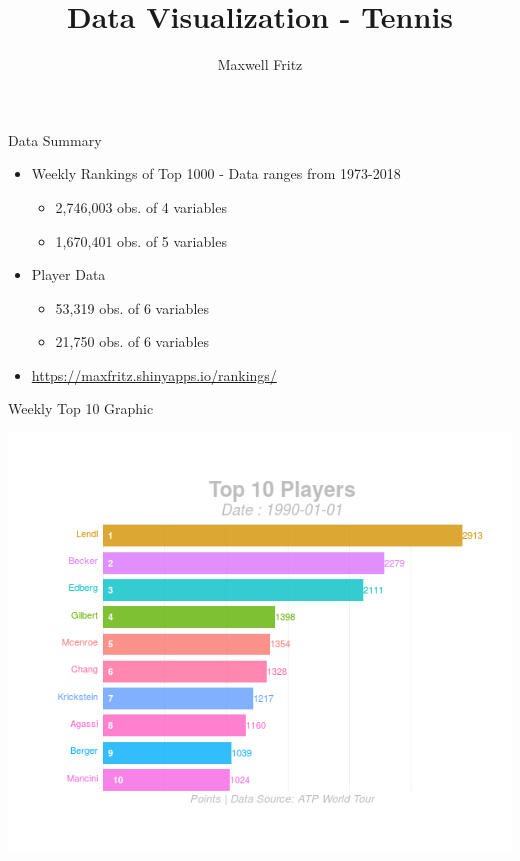 \documentclass[ignorenonframetext,]{beamer}
\title{Data Visualization - Tennis}
\author{Maxwell Fritz}
\date{}
\providecommand{\tightlist}{%
  \setlength{\itemsep}{0pt}\setlength{\parskip}{0pt}}
\begin{document}
\frame{\titlepage}

\begin{frame}{Data Summary}
\protect\hypertarget{data-summary}{}

\begin{itemize}[<+->]
\tightlist
\item
  Weekly Rankings of Top 1000 - Data ranges from 1973-2018

  \begin{itemize}[<+->]
  \tightlist
  \item
    2,746,003 obs. of 4 variables
  \item
    1,670,401 obs. of 5 variables 
  \end{itemize}
\item
  Player Data

  \begin{itemize}[<+->]
  \tightlist
  \item
    53,319 obs. of 6 variables
  \item
    21,750 obs. of 6 variables 
  \end{itemize}
\end{itemize}

\begin{itemize}[<+->]
\tightlist
\item
  \url{https://maxfritz.shinyapps.io/rankings/}
\end{itemize}

\end{frame}

\begin{frame}{Weekly Top 10 Graphic}
\protect\hypertarget{weekly-top-10-graphic}{}

\includegraphics{gganim_test3.gif}

\end{frame}
\end{document}
